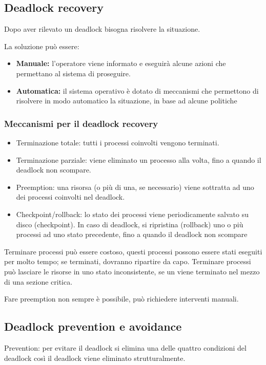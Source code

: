 \subsection{Deadlock recovery}
Dopo aver rilevato un deadlock bisogna risolvere la situazione.

La soluzione può essere:
\begin{itemize}
    \item \textbf{Manuale:} l'operatore viene informato e eseguirà alcune azioni che permettano al sistema di proseguire.
    \item \textbf{Automatica:} il sistema operativo è dotato di meccanismi che permettono di risolvere in modo automatico la situazione, in base ad alcune politiche
\end{itemize}

\subsubsection{Meccanismi per il deadlock recovery}
\begin{itemize}
    \item Terminazione totale: tutti i processi coinvolti vengono terminati.
    \item Terminazione parziale: viene eliminato un processo alla volta, fino a quando il deadlock non scompare.
    \item Preemption: una risorsa (o più di una, se necessario) viene sottratta ad uno dei processi coinvolti nel deadlock.
    \item Checkpoint/rollback: lo stato dei processi viene periodicamente salvato su disco
(checkpoint). 
In caso di deadlock, si ripristina (rollback) uno o più processi
ad uno stato precedente, fino a quando il deadlock non scompare
\end{itemize}


Terminare processi può essere costoso, questi processi possono essere stati eseguiti per molto tempo; se terminati, dovranno ripartire da capo.
Terminare processi può lasciare le risorse in uno stato inconsistente, se un viene terminato nel mezzo di una sezione critica.

Fare preemption non sempre è possibile, può richiedere interventi manuali.

\subsection{Deadlock prevention e avoidance}
Prevention: per evitare il deadlock si elimina una delle quattro condizioni del deadlock così il deadlock viene eliminato strutturalmente.

